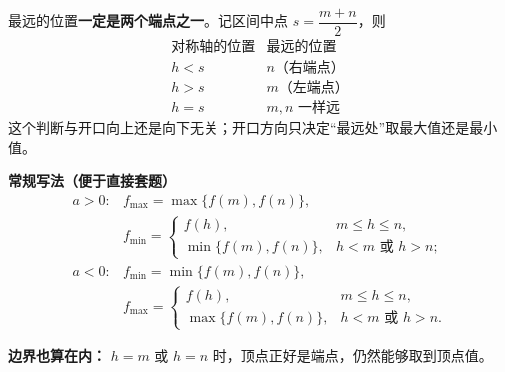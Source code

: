 \begin{statementbox}
最远的位置\textbf{一定是两个端点之一}。记区间中点 $s=\dfrac{m+n}{2}$，则
\[
\begin{array}{c|c}
\text{对称轴的位置}&\text{最远的位置}\\ \hline
h<s&n\text{（右端点）}\\
h>s&m\text{（左端点）}\\
h=s&m,n\text{ 一样远}
\end{array}
\]
这个判断与开口向上还是向下无关；开口方向只决定“最远处”取最大值还是最小值。

\medskip
\end{statementbox}\clearpage\begin{statementbox}\textbf{\textcolor{CStatement}{常规写法（便于直接套题）}}
\[
\begin{array}{ll}
 a>0:& f_{\max}=\max\{f(m),f(n)\},\\
 &f_{\min}=\begin{cases}
 f(h),&m\le h\le n,\\
 \min\{f(m),f(n)\},&h<m\text{ 或 }h>n;
 \end{cases}\\[1em]
 a<0:& f_{\min}=\min\{f(m),f(n)\},\\
 &f_{\max}=\begin{cases}
 f(h),&m\le h\le n,\\
 \max\{f(m),f(n)\},&h<m\text{ 或 }h>n.
 \end{cases}
\end{array}
\]

\textbf{边界也算在内：} $h=m$ 或 $h=n$ 时，顶点正好是端点，仍然能够取到顶点值。
\end{statementbox}
